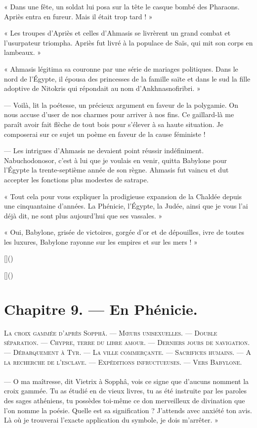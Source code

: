 \documentclass[a4paper, 11pt, oneside, polutonikogreek, french]{article}
\begin{document}
« Dans une fête, un soldat lui posa sur la tête le casque bombé des Pharaons. Apriès entra en fureur. Mais il était trop tard ! »

« Les troupes d'Apriès et celles d'Ahmasis se livrèrent un grand combat et l'usurpateur triompha. Apriès fut livré à la populace de Saïs, qui mit son corps en lambeaux. »

« Ahmasis légitima sa couronne par une série de mariages politiques. Dans le nord de l'Égypte, il épousa des princesses de la famille saïte et dans le sud la fille adoptive de Nitokris qui répondait au nom d'Ankhnasnofiribri. »

--- Voilà, lit la poétesse, un précieux argument en faveur de la polygamie. On nous accuse d'user de nos charmes pour arriver à nos fins. Ce gaillard-là me paraît avoir fait flèche de tout bois pour s'élever à sa haute situation. Je composerai sur ce sujet un poème en faveur de la cause féministe !

--- Les intrigues d'Ahmasis ne devaient point réussir indéfiniment. Nabuchodonosor, c'est à lui que je voulais en venir, quitta Babylone pour l'Égypte la trente-septième année de son règne. Ahmasis fut vaincu et dut accepter les fonctions plus modestes de satrape.

« Tout cela pour vous expliquer la prodigieuse expansion de la Chaldée depuis une cinquantaine d'années. La Phénicie, l'Égypte, la Judée, ainsi que je vous l'ai déjà dit, ne sont plus aujourd'hui que ses vassales. »

« Oui, Babylone, grisée de victoires, gorgée d'or et de dépouilles, ivre de toutes les luxures, Babylone rayonne sur les empires et sur les mers ! »

[]()

[]()
\clearpage
\section{Chapitre 9. --- En Phénicie.}
\begin{center}
\scshape
\small
La croix gammée d'après Sopphâ. --- Mœurs unisexuelles. --- Double séparation. --- Chypre, terre du libre amour. --- Derniers jours de navigation. --- Débarquement à Tyr. --- La ville commerçante. --- Sacrifices humains. --- A la recherche de l'esclave. --- Expéditions infructueuses. --- Vers Babylone.
\end{center}
\paragraph{}
--- O ma maîtresse, dit Vietrix à Sopphâ, vois ce signe que d'aucuns nomment la croix gammée. Tu as étudié en de vieux livres, tu as été instruite par les paroles des sages athéniens, tu possèdes toi-même ce don merveilleux de divination que l'on nomme la poésie. Quelle est sa signification ? J'attends avec anxiété ton avis. Là où je trouverai l'exacte application du symbole, je dois m'arrêter. »
\end{document}

